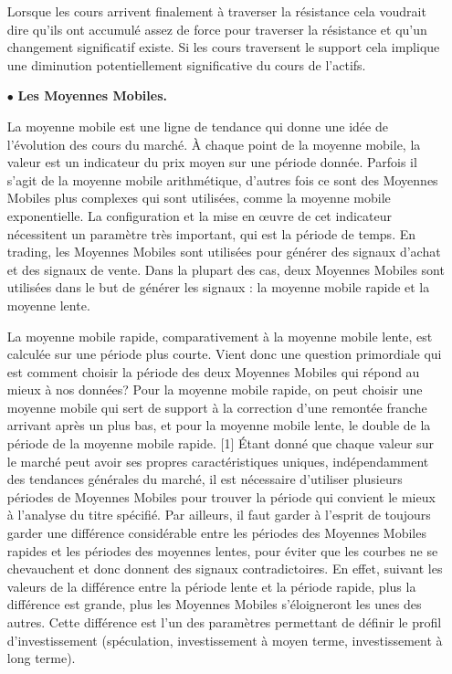 \begin{itemize}
{    Lorsque les cours arrivent finalement à traverser la résistance cela voudrait dire qu'ils ont accumulé
    assez de force pour traverser la résistance et qu'un changement significatif existe.
    Si les cours traversent le support cela implique une diminution potentiellement significative du cours de l'actifs.}

	
	\item[$\bullet$] \textbf{Les Moyennes Mobiles.}
	\par{La moyenne mobile est une ligne de tendance qui donne une idée de l'évolution des cours du marché.
	À chaque point de la moyenne mobile, la valeur est un indicateur du prix moyen sur une période donnée.
	Parfois il s'agit de la moyenne mobile arithmétique, d'autres fois ce sont des Moyennes Mobiles plus complexes qui sont 
	utilisées, comme la moyenne mobile exponentielle. La configuration et la mise en œuvre de cet indicateur 
	nécessitent un paramètre très important, qui est la période de temps.
	En trading, les Moyennes Mobiles sont utilisées pour générer des signaux d'achat et des signaux de vente. 
	Dans la plupart des cas, deux Moyennes Mobiles sont utilisées dans le but de générer les signaux : 
	la moyenne mobile rapide et la moyenne lente.}

	\par{La moyenne mobile rapide, comparativement à la moyenne mobile lente, est calculée sur une période plus courte. 
	Vient donc une question primordiale qui est comment choisir la période des deux Moyennes Mobiles 
	qui répond au mieux à nos données? Pour la moyenne mobile rapide, on peut choisir une moyenne mobile qui 
	sert de support à la correction d'une remontée franche arrivant après un plus bas, et pour la 
	moyenne mobile lente, le double de la période de la moyenne mobile rapide. [1] Étant donné que chaque valeur sur le marché 
	peut avoir ses propres caractéristiques uniques, indépendamment des tendances générales du marché, il est nécessaire
	d'utiliser plusieurs périodes de Moyennes Mobiles pour trouver la période qui convient le mieux à l'analyse 
	du titre spécifié. Par ailleurs, il faut garder à l'esprit de toujours garder une différence considérable entre 
	les périodes des Moyennes Mobiles rapides et les périodes des moyennes lentes, pour éviter que les courbes ne se 
	chevauchent et donc donnent des signaux contradictoires. En effet, suivant les valeurs de la différence entre
	la période lente et la période rapide, plus la différence est grande, plus les Moyennes Mobiles s'éloigneront les 
	unes des autres. Cette différence est l'un des paramètres permettant de définir le profil d'investissement (spéculation,
	investissement à moyen terme, investissement à long terme). }



\end{itemize}
